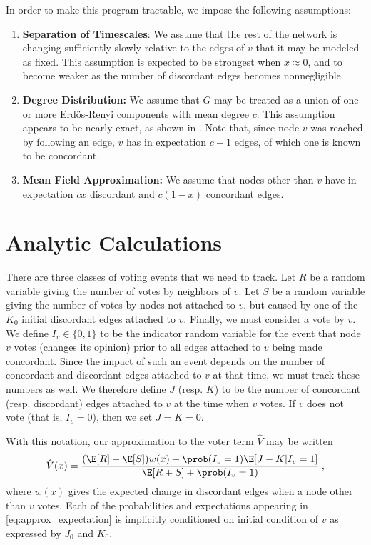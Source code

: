 \documentclass[english]{scrartcl}
\begin{document}
	In order to make this program tractable, we impose the following assumptions: 
	\begin{enumerate}
		\item \textbf{Separation of Timescales}: We assume that the rest of the network is changing sufficiently slowly relative to the edges of $v$ that it may be modeled as fixed. This assumption is expected to be strongest when $x \approx 0$, and to become weaker as the number of discordant edges becomes nonnegligible. 
		\item \textbf{Degree Distribution:} We assume that $G$ may be treated as a union of one or more Erd\"{o}s-Renyi components with mean degree $c$. This assumption appears to be nearly exact, as shown in \cite{Demirel2012}. Note that, since node $v$ was reached by following an edge, $v$ has in expectation $c+1$ edges, of which one is known to be concordant. 
		\item \textbf{Mean Field Approximation:} We assume that nodes other than $v$ have in expectation $cx$ discordant and $c(1-x)$ concordant edges. 
	\end{enumerate}

\section{Analytic Calculations} \label{sec:analytic}
	There are three classes of voting events that we need to track. 
	Let $R$ be a random variable giving the number of votes by neighbors of $v$. Let $S$ be a random variable giving the number of votes by nodes not attached to $v$, but caused by one of the $K_0$ initial discordant edges attached to $v$. 
	Finally, we must consider a vote by $v$. We define $I_v \in \{0,1\}$ to be the indicator random variable for the event that node $v$ votes (changes its opinion) prior to all edges attached to $v$ being made concordant. Since the impact of such an event depends on the number of concordant and discordant edges attached to $v$ at that time, we must track these numbers as well. We therefore define $J$ (resp. $K$) to be the number of concordant (resp. discordant) edges attached to $v$ at the time when $v$ votes. If $v$ does not vote (that is, $I_v = 0$), then we set $J = K = 0$. 

	With this notation, our approximation to the voter term $\hat{V}$ may be written 
	\begin{equation}
		\hat{V}(x) = \frac{(\E[R] + \E[S])w(x) + \prob(I_v = 1) \E[J - K|I_v = 1]}{\E[R+S] + \prob(I_v = 1)}\;, \label{eq:approx_expectation}
	\end{equation}
	where $w(x)$ gives the expected change in discordant edges when a node other than $v$ votes. Each of the probabilities and expectations appearing in \eqref{eq:approx_expectation} is implicitly conditioned on initial condition of $v$ as expressed by $J_0$ and $K_0$. 
\end{document}
